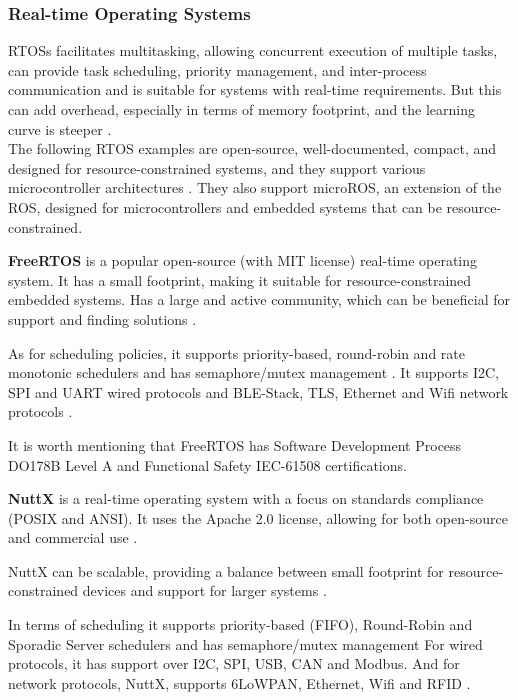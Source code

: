 \subsubsection{Real-time Operating Systems}
\glspl{RTOS} facilitates multitasking, allowing concurrent execution of multiple tasks, can provide task scheduling, priority management, and inter-process communication and is suitable for systems with real-time requirements.
But this can add overhead, especially in terms of memory footprint, and the learning curve is steeper \cite{RTOS1}.\\
The following \gls{RTOS} examples are open-source, well-documented, compact, and designed for resource-constrained systems, and they support various microcontroller architectures \cite{RTOS5}.
They also support microROS, an extension of the \gls{ROS}, designed for microcontrollers and embedded systems that can be resource-constrained.


\textbf{FreeRTOS} is a popular open-source (with MIT license) real-time operating system.
It has a small footprint, making it suitable for resource-constrained embedded systems.
Has a large and active community, which can be beneficial for support and finding solutions \cite{RTOS6}.

As for scheduling policies, it supports priority-based, round-robin and rate monotonic schedulers and has semaphore/mutex management \cite{compRTOS}.
It supports \gls{I2C}, \gls{SPI} and \gls{UART} wired protocols and \gls{BLE}-Stack, \gls{TLS}, Ethernet and \gls{Wifi} network protocols \cite{compRTOS}.

It is worth mentioning that FreeRTOS has Software Development Process DO178B Level A and Functional Safety IEC-61508 certifications.


\textbf{NuttX} is a real-time operating system with a focus on standards compliance (POSIX and ANSI).
It uses the Apache 2.0 license, allowing for both open-source and commercial use \cite{nuttx}.

NuttX can be scalable, providing a balance between small footprint for resource-constrained devices and support for larger systems \cite{nuttx}.

In terms of scheduling it supports priority-based (\gls{FIFO}), Round-Robin and Sporadic Server schedulers and has semaphore/mutex management
For wired protocols, it has support over \gls{I2C}, \gls{SPI}, \gls{USB}, \gls{CAN} and Modbus.
And for network protocols, NuttX, supports 6LoWPAN, Ethernet, \gls{Wifi} and \gls{RFID} \cite{compRTOS}.



